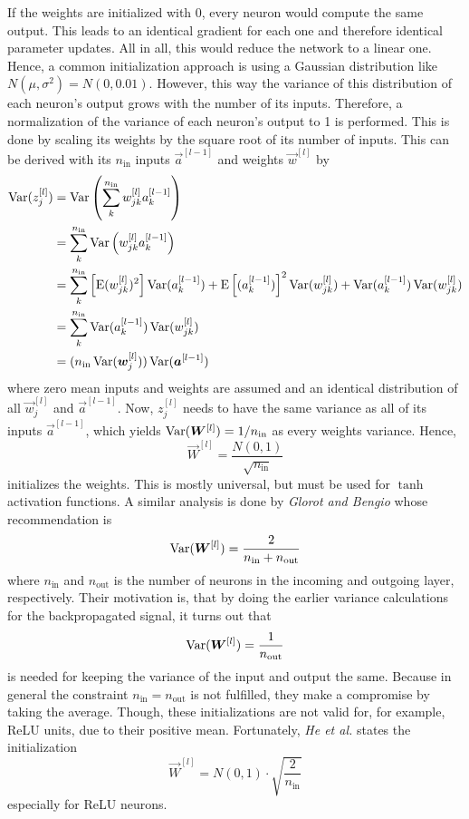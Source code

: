 If the weights are initialized with 0, every neuron would compute the same output.
This leads to an identical gradient for each one and therefore identical parameter updates.
All in all, this would reduce the network to a linear one.
Hence, a common initialization approach is using a Gaussian distribution like $N(\mu, \sigma^2) = N(0, 0.01)$.
However, this way the variance of this distribution of each neuron's output grows with the number of its inputs.
Therefore, a normalization of the variance of each neuron's output to 1 is performed.
This is done by scaling its weights by the square root of its number of inputs.
This can be derived with its $n_{\text{in}}$ inputs $\vec{a}^{[l-1]}$ and weights $\vec{w}^{[l]}$ by
\begin{align*}
	\operatorname{\mathrm{Var}}(z^{[l]}_{j}) &= \operatorname{\mathrm{Var}} \left( \sum_{k}^{n_{\text{in}}} w^{[l]}_{jk} a^{[l-1]}_k \right) \\
	&= \sum_{k}^{n_{\text{in}}} \operatorname{\mathrm{Var}} \left( w^{[l]}_{jk} a^{[l-1]}_k \right) \\
	&= \sum_{k}^{n_{\text{in}}} \left[ \operatorname{\mathrm{E}}(w^{[l]}_{jk})^2 \right] \operatorname{\mathrm{Var}}(a^{[l-1]}_k) + \operatorname{\mathrm{E}} \left[ (a^{[l-1]}_k) \right]^2 \operatorname{\mathrm{Var}}(w^{[l]}_{jk}) + \operatorname{\mathrm{Var}}(a^{[l-1]}_k) \operatorname{\mathrm{Var}}(w^{[l]}_{jk}) \\
	&= \sum_{k}^{n_{\text{in}}} \operatorname{\mathrm{Var}}(a^{[l-1]}_k) \operatorname{\mathrm{Var}}(w^{[l]}_{jk}) \\
	&= (n_{\text{in}} \operatorname{\mathrm{Var}}(\bm{w}^{[l]}_j)) \operatorname{\mathrm{Var}}(\bm{a}^{[l-1]}) \\
\end{align*}
where zero mean inputs and weights are assumed and an identical distribution of all $\vec{w}^{[l]}_{j}$ and $\vec{a}^{[l-1]}$.
Now, $z_j^{[l]}$ needs to have the same variance as all of its inputs $\vec{a}^{[l-1]}$, which yields $\operatorname{\mathrm{Var}}(\bm{W}^{[l]}) = 1/n_{\text{in}}$ as every weights variance.
Hence,
\begin{equation}
	\vec{W}^{[l]} = \frac{N(0,1)}{\sqrt{n_{\text{in}}}}
\end{equation}
initializes the weights.
This is mostly universal, but must be used for $\tanh$ activation functions.
A similar analysis is done by \textit{Glorot and Bengio} \cite{Glorot10understandingthe} whose recommendation is
\begin{equation*}
	\operatorname{\mathrm{Var}}(\bm{W}^{[l]}) = \frac{2}{n_{\text{in}} + n_{\text{out}}}
\end{equation*}
where $n_{\text{in}}$ and $n_{\text{out}}$ is the number of neurons in the incoming and outgoing layer, respectively.
Their motivation is, that by doing the earlier variance calculations for the backpropagated signal, it turns out that
\begin{equation}
	\operatorname{\mathrm{Var}}(\bm{W}^{[l]}) = \frac{1}{n_{\text{out}}}
\end{equation}
is needed for keeping the variance of the input and output the same.
Because in general the constraint $n_{\text{in}} = n_{\text{out}}$ is not fulfilled, they make a compromise by taking the average.
Though, these initializations are not valid for, for example, ReLU units, due to their positive mean.
Fortunately, \textit{He et al.} \cite{DBLP:journals/corr/HeZR015} states the initialization
\begin{equation}
	\vec{W}^{[l]} = N(0,1) \cdot \sqrt{\frac{2}{n_{\text{in}}}}
\end{equation}
especially for ReLU neurons.